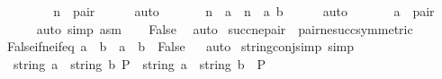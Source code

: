 \begin{isabellebody}
\ \ \isamarkupfalse%
\ \isamarkupfalse%
\isanewline
\ \ \ \ {\isachardoublequoteopen}n\ {\isasymin}\ {\isacharquery}{\kern0pt}pair{\isachardoublequoteclose}\isanewline
\ \ \ \ \isamarkupfalse%
\ auto\isanewline
\ \ \isamarkupfalse%
\isanewline
\ \ \ \ {\isachardoublequoteopen}n\ {\isacharequal}{\kern0pt}\ {\isacharbraceleft}{\kern0pt}a{\isacharbraceright}{\kern0pt}\ {\isasymor}\ n\ {\isacharequal}{\kern0pt}\ {\isacharbraceleft}{\kern0pt}a{\isacharcomma}{\kern0pt}\ b{\isacharbraceright}{\kern0pt}{\isachardoublequoteclose}\isanewline
\ \ \ \ \isamarkupfalse%
\ auto\isanewline
\ \ \isamarkupfalse%
\isanewline
\ \ \ \ {\isachardoublequoteopen}a\ {\isasymin}\ {\isacharquery}{\kern0pt}pair{\isachardoublequoteclose}\isanewline
\ \ \ \ \isamarkupfalse%
\ {\isacharparenleft}{\kern0pt}auto\ simp{\isacharcolon}{\kern0pt}\ asm{\isacharparenright}{\kern0pt}\isanewline
\ \ \isamarkupfalse%
\ False\ \isamarkupfalse%
\ auto\isanewline
{}\isamarkupfalse%
%
\endisatagproof
{\isafoldproof}%
%
\isadelimproof
\isanewline
%
\endisadelimproof
\isanewline
{}\isamarkupfalse%
\ succ{\isacharunderscore}{\kern0pt}ne{\isacharunderscore}{\kern0pt}pair\ {\isacharequal}{\kern0pt}\ pair{\isacharunderscore}{\kern0pt}ne{\isacharunderscore}{\kern0pt}succ{\isacharbrackleft}{\kern0pt}symmetric{\isacharbrackright}{\kern0pt}%
\isadelimdocument
%
\endisadelimdocument
%
\isatagdocument
%
\isamarkuptrue%
%
\endisatagdocument
{\isafolddocument}%
%
\isadelimdocument
%
\endisadelimdocument
{}\isamarkupfalse%
\ False{\isacharunderscore}{\kern0pt}if{\isacharunderscore}{\kern0pt}ne{\isacharunderscore}{\kern0pt}if{\isacharunderscore}{\kern0pt}eq{\isacharcolon}{\kern0pt}\ {\isachardoublequoteopen}a\ {\isacharequal}{\kern0pt}\ b\ {\isasymLongrightarrow}\ a\ {\isasymnoteq}\ b\ {\isasymLongrightarrow}\ False{\isachardoublequoteclose}%
\isadelimproof
\ %
\endisadelimproof
%
\isatagproof
{}\isamarkupfalse%
\ auto%
\endisatagproof
{\isafoldproof}%
%
\isadelimproof
%
\endisadelimproof
\isanewline
\isanewline
{}\isamarkupfalse%
\ string{\isacharunderscore}{\kern0pt}conj{\isacharunderscore}{\kern0pt}simp\ {\isacharbrackleft}{\kern0pt}simp{\isacharbrackright}{\kern0pt}{\isacharcolon}{\kern0pt}\isanewline
\ \ {\isachardoublequoteopen}{\isasymlbrakk}string\ a\ {\isasymnoteq}\ string\ b{\isacharsemicolon}{\kern0pt}\ P{\isasymrbrakk}\ {\isasymLongrightarrow}\ string\ a\ {\isasymnoteq}\ string\ b\ {\isasymand}\ P{\isachardoublequoteclose}%

\end{isabellebody}
